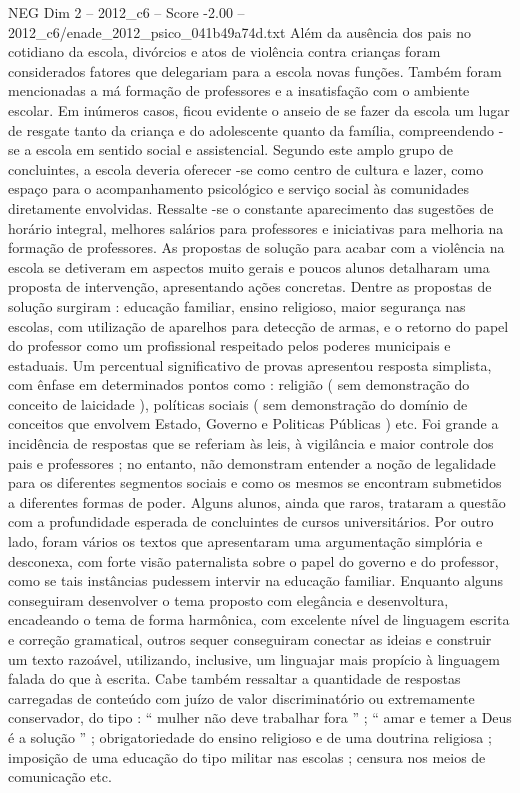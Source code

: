 \begin{textsample}{NEG Dim 2 – 2012\_c6 – Score -2.00 – 2012\_c6/enade\_2012\_psico\_041b49a74d.txt}
Além da ausência dos pais no cotidiano da escola, divórcios e atos de violência contra crianças foram considerados fatores que delegariam para a escola novas funções.
Também foram mencionadas a má formação de professores e a insatisfação com o ambiente escolar.
Em inúmeros casos, ficou evidente o anseio de se fazer da escola um lugar de resgate tanto da criança e do adolescente quanto da família, compreendendo -se a escola em sentido social e assistencial.
Segundo este amplo grupo de concluintes, a escola deveria oferecer -se como centro de cultura e lazer, como espaço para o acompanhamento psicológico e serviço social às comunidades diretamente envolvidas.
Ressalte -se o constante aparecimento das sugestões de horário integral, melhores salários para professores e iniciativas para melhoria na formação de professores.
As propostas de solução para acabar com a violência na escola se detiveram em aspectos muito gerais e poucos alunos detalharam uma proposta de intervenção, apresentando ações concretas.
Dentre as propostas de solução surgiram : educação familiar, ensino religioso, maior segurança nas escolas, com utilização de aparelhos para detecção de armas, e o retorno do papel do professor como um profissional respeitado pelos poderes municipais e estaduais.
Um percentual significativo de provas apresentou resposta simplista, com ênfase em determinados pontos como : religião ( sem demonstração do conceito de laicidade ), políticas sociais ( sem demonstração do domínio de conceitos que envolvem Estado, Governo e Politicas Públicas ) etc.
Foi grande a incidência de respostas que se referiam às leis, à vigilância e maior controle dos pais e professores ; no entanto, não demonstram entender a noção de legalidade para os diferentes segmentos sociais e como os mesmos se encontram submetidos a diferentes formas de poder.
Alguns alunos, ainda que raros, trataram a questão com a profundidade esperada de concluintes de cursos universitários.
Por outro lado, foram vários os textos que apresentaram uma argumentação simplória e desconexa, com forte visão paternalista sobre o papel do governo e do professor, como se tais instâncias pudessem intervir na educação familiar.
Enquanto alguns conseguiram desenvolver o tema proposto com elegância e desenvoltura, encadeando o tema de forma harmônica, com excelente nível de linguagem escrita e correção gramatical, outros sequer conseguiram conectar as ideias e construir um texto razoável, utilizando, inclusive, um linguajar mais propício à linguagem falada do que à escrita.
Cabe também ressaltar a quantidade de respostas carregadas de conteúdo com juízo de valor discriminatório ou extremamente conservador, do tipo : “ mulher não deve trabalhar fora ” ; “ amar e temer a Deus é a solução ” ; obrigatoriedade do ensino religioso e de uma doutrina religiosa ; imposição de uma educação do tipo militar nas escolas ; censura nos meios de comunicação etc.

\end{textsample}
